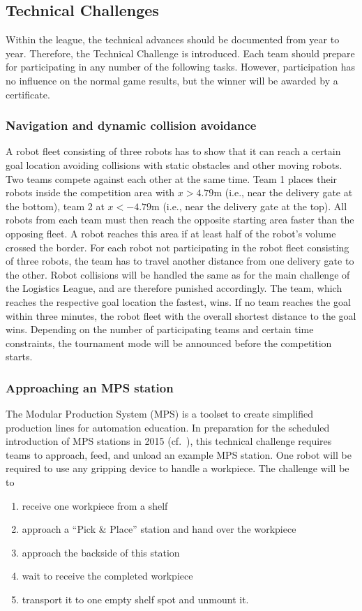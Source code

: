 \documentclass[12pt,twoside]{article}
\begin{document}
\subsection{Technical Challenges}
\label{sec:technical-challenge}
Within the league, the technical advances should be documented from
year to year. Therefore, the Technical Challenge is introduced. Each
team should prepare for participating in any number of the following
tasks. However, participation has no influence on the normal game
results, but the winner will be awarded by a certificate.


\subsubsection{Navigation and dynamic collision avoidance}
A robot fleet consisting of three robots has to show that it can reach
a certain goal location avoiding collisions with static obstacles and
other moving robots. Two teams compete against each other at the same
time. Team 1 places their robots inside the competition area with $x >
4.79$m (i.e., near the delivery gate at the bottom), team 2 at $x <
-4.79$m (i.e., near the delivery gate at the top). All robots from
each team must then reach the opposite starting area faster than the
opposing fleet. A robot reaches this area if at least half of the
robot's volume crossed the border. For each robot not participating in
the robot fleet consisting of three robots, the team has to travel
another distance from one delivery gate to the other. Robot collisions
will be handled the same as for the main challenge of the Logistics
League, and are therefore punished accordingly. The team, which
reaches the respective goal location the fastest, wins. If no team
reaches the goal within three minutes, the robot fleet with the
overall shortest distance to the goal wins. Depending on the number of
participating teams and certain time constraints, the tournament mode
will be announced before the competition starts.

\subsubsection{Approaching an MPS station}
The Modular Production System (MPS) is a toolset to create simplified
production lines for automation education. In preparation for the
scheduled introduction of MPS stations in 2015 (cf.~\cite{wdrl2013}),
this technical challenge requires teams to approach, feed, and unload
an example MPS station. One robot will be required to use any gripping
device to handle a workpiece. The challenge will be to
\begin{enumerate}
\item receive one workpiece from a shelf
\item approach a ``Pick \& Place'' station and hand over the workpiece
\item approach the backside of this station
\item wait to receive the completed workpiece
\item transport it to one empty shelf spot and unmount it.
\end{enumerate}
\end{document}
